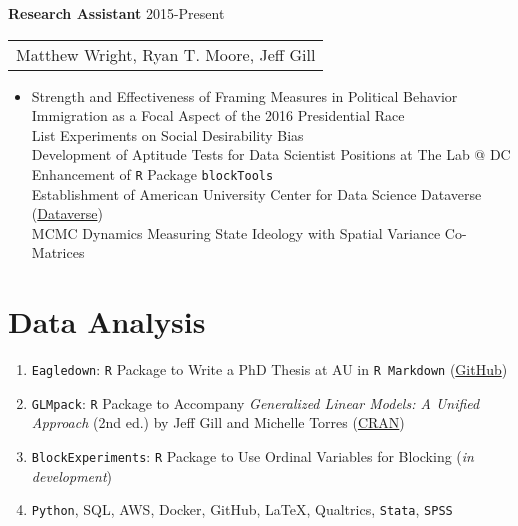 \documentclass[11pt]{article}
\begin{document}
\begin{flushleft}
\textbf{Research Assistant} \hfill{2015-Present}


\begin{tabular*}{1\textwidth}{@{\extracolsep{\fill}}l}
Matthew Wright, Ryan T. Moore, Jeff Gill
\end{tabular*}
\vspace{-0.6cm}

\begin{itemize}
\item[] Strength and Effectiveness of Framing Measures in Political Behavior \\
Immigration as a Focal Aspect of the 2016 Presidential Race\\
List Experiments on Social Desirability Bias\\
Development of Aptitude Tests for Data Scientist Positions at The Lab @ DC\\
Enhancement of {\tt R} Package {\tt blockTools}\\
Establishment of American University Center for Data Science Dataverse (\href{https://dataverse.harvard.edu/dataverse/americanu_cds}{Dataverse})\\
MCMC Dynamics Measuring State Ideology with Spatial Variance Co-Matrices
\end{itemize}




\section*{Data Analysis}
\begin{enumerate}[leftmargin=!,labelindent=20pt,itemindent=-20pt]
\item[] {\tt Eagledown}: {\tt R} Package to Write a PhD Thesis at AU in {\tt R Markdown} (\href{https://github.com/SimonHeuberger/eagledown}{GitHub})
\vspace{-0.27cm}
\item[] {\tt GLMpack}: {\tt R} Package to Accompany \textit{Generalized Linear Models: A Unified Approach} (2nd ed.) by Jeff Gill and Michelle Torres (\href{https://cran.r-project.org/web/packages/GLMpack/index.html}{CRAN})
\vspace{-0.27cm}
\item[] {\tt BlockExperiments}: {\tt R} Package to Use Ordinal Variables for Blocking (\textit{in development})
\vspace{-0.27cm}
\item[] \texttt{Python}, SQL, AWS, Docker, GitHub, \LaTeX, Qualtrics, \texttt{Stata}, \texttt{SPSS} 
\end{enumerate}





\end{flushleft}
\end{document}
